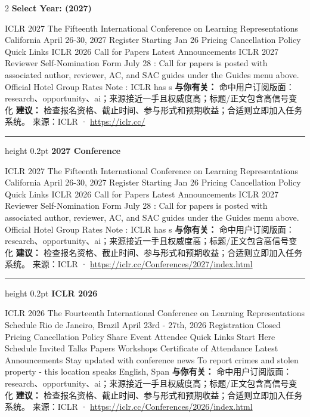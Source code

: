 \documentclass[10.5pt]{ctexart}
\begin{document}
\begin{multicols}{2}
{\large\bfseries Select Year: (2027)}\par
ICLR 2027 The Fifteenth International Conference on Learning Representations California April 26-30, 2027 Register Starting Jan 26 Pricing Cancellation Policy Quick Links ICLR 2026 Call for Papers Latest Announcements ICLR 2027 Reviewer Self-Nomination Form July 28 : Call for papers is posted with associated author, reviewer, AC, and SAC guides under the Guides menu above. Official Hotel Group Rates Note : ICLR has s
\textbf{与你有关：} 命中用户订阅版面：research、opportunity、ai；来源接近一手且权威度高；标题/正文包含高信号变化
\textbf{建议：} 检查报名资格、截止时间、参与形式和预期收益；合适则立即加入任务系统。
{\footnotesize\color{ormuted} 来源：ICLR · \url{https://iclr.cc/}}
\vspace{2mm}
\hrule height 0.2pt
\vspace{2mm}
{\large\bfseries 2027 Conference}\par
ICLR 2027 The Fifteenth International Conference on Learning Representations California April 26-30, 2027 Register Starting Jan 26 Pricing Cancellation Policy Quick Links ICLR 2026 Call for Papers Latest Announcements ICLR 2027 Reviewer Self-Nomination Form July 28 : Call for papers is posted with associated author, reviewer, AC, and SAC guides under the Guides menu above. Official Hotel Group Rates Note : ICLR has s
\textbf{与你有关：} 命中用户订阅版面：research、opportunity、ai；来源接近一手且权威度高；标题/正文包含高信号变化
\textbf{建议：} 检查报名资格、截止时间、参与形式和预期收益；合适则立即加入任务系统。
{\footnotesize\color{ormuted} 来源：ICLR · \url{https://iclr.cc/Conferences/2027/index.html}}
\vspace{2mm}
\hrule height 0.2pt
\vspace{2mm}
{\large\bfseries ICLR 2026}\par
ICLR 2026 The Fourteenth International Conference on Learning Representations Schedule Rio de Janeiro, Brazil April 23rd - 27th, 2026 Registration Closed Pricing Cancellation Policy Share Event Attendee Quick Links Start Here Schedule Invited Talks Papers Workshops Certificate of Attendance Latest Announcements Stay updated with conference news To report crimes and stolen property - this location speaks English, Span
\textbf{与你有关：} 命中用户订阅版面：research、opportunity、ai；来源接近一手且权威度高；标题/正文包含高信号变化
\textbf{建议：} 检查报名资格、截止时间、参与形式和预期收益；合适则立即加入任务系统。
{\footnotesize\color{ormuted} 来源：ICLR · \url{https://iclr.cc/Conferences/2026/index.html}}

\end{multicols}
\end{document}
